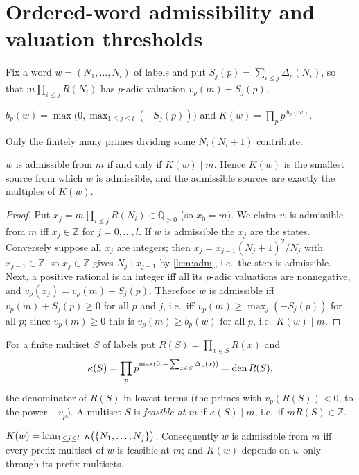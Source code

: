 \section{Ordered-word admissibility and valuation thresholds}\label{sec:threshold}
Fix a word $w=(N_1,\dots,N_l)$ of labels and put $S_j(p)=\sum_{i\le j}\Delta_p(N_i)$, so that $m\prod_{i\le j}R(N_i)$ has $p$-adic valuation $v_p(m)+S_j(p)$.
\begin{definition}[threshold]\label{def:K}
$b_p(w)=\max\bigl(0,\max_{1\le j\le l}(-S_j(p))\bigr)$ and $K(w)=\prod_p p^{\,b_p(w)}$.
\end{definition}
Only the finitely many primes dividing some $N_i(N_i+1)$ contribute.
\begin{theorem}\label{thm:threshold}
$w$ is admissible from $m$ if and only if $K(w)\mid m$. Hence $K(w)$ is the smallest source from which $w$ is admissible, and the admissible sources are exactly the multiples of $K(w)$.
\end{theorem}
\begin{proof}
Put $x_j=m\prod_{i\le j}R(N_i)\in\mathbb Q_{>0}$ (so $x_0=m$). We claim $w$ is admissible from $m$ iff $x_j\in\mathbb Z$ for $j=0,\dots,l$. If $w$ is admissible the $x_j$ are the states. Conversely suppose all $x_j$ are integers; then $x_j=x_{j-1}(N_j+1)^2/N_j$ with $x_{j-1}\in\mathbb Z$, so $x_j\in\mathbb Z$ gives $N_j\mid x_{j-1}$ by \cref{lem:adm}, i.e.\ the step is admissible. Next, a positive rational is an integer iff all its $p$-adic valuations are nonnegative, and $v_p(x_j)=v_p(m)+S_j(p)$. Therefore $w$ is admissible iff $v_p(m)+S_j(p)\ge0$ for all $p$ and $j$, i.e.\ iff $v_p(m)\ge\max_j(-S_j(p))$ for all $p$; since $v_p(m)\ge0$ this is $v_p(m)\ge b_p(w)$ for all $p$, i.e.\ $K(w)\mid m$.
\end{proof}
\medskip
For a finite multiset $S$ of labels put $R(S)=\prod_{x\in S}R(x)$ and
\[
 \kappa(S)=\prod_p p^{\max(0,-\sum_{x\in S}\Delta_p(x))}=\operatorname{den} R(S),
\]
the denominator of $R(S)$ in lowest terms (the primes with $v_p(R(S))<0$, to the power $-v_p$). A multiset $S$ is \emph{feasible at $m$} if $\kappa(S)\mid m$, i.e.\ if $mR(S)\in\mathbb Z$.
\begin{corollary}\label{cor:P}
$K(w)=\lcm_{1\le j\le l}\ \kappa\bigl(\{N_1,\dots,N_j\}\bigr)$. Consequently $w$ is admissible from $m$ iff every prefix multiset of $w$ is feasible at $m$; and $K(w)$ depends on $w$ only through its prefix multisets.
\end{corollary}
